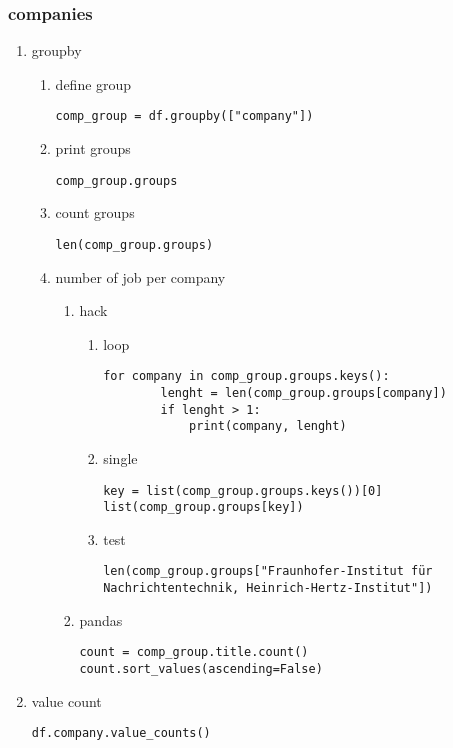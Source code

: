 \documentclass[11pt]{article}
\begin{document}
\subsubsection{companies}
\label{sec:orgbe85ddd}
\begin{enumerate}
\item groupby
\label{sec:org1908700}
\begin{enumerate}
\item define group
\label{sec:org2ef7af7}
\begin{verbatim}
comp_group = df.groupby(["company"])
\end{verbatim}

\item print groups
\label{sec:org9c28d8b}
\begin{verbatim}
comp_group.groups
\end{verbatim}
\item count groups
\label{sec:org6930f1d}
\begin{verbatim}
len(comp_group.groups)
\end{verbatim}
\item number of job per company
\label{sec:org691ee97}
\begin{enumerate}
\item hack
\label{sec:org04f9b52}
\begin{enumerate}
\item loop
\label{sec:org7eaaf0a}
\begin{verbatim}
for company in comp_group.groups.keys():
	    lenght = len(comp_group.groups[company])
	    if lenght > 1:
			print(company, lenght)
\end{verbatim}

\item single
\label{sec:orgf061eda}
\begin{verbatim}
key = list(comp_group.groups.keys())[0]
list(comp_group.groups[key])
\end{verbatim}

\item test
\label{sec:orgc584759}
\begin{verbatim}
len(comp_group.groups["Fraunhofer-Institut für Nachrichtentechnik, Heinrich-Hertz-Institut"])
\end{verbatim}
\end{enumerate}
\item pandas
\label{sec:orgcf29eac}
\begin{verbatim}
count = comp_group.title.count()
count.sort_values(ascending=False)
\end{verbatim}
\end{enumerate}
\end{enumerate}

\item value count
\label{sec:org0287973}
\begin{verbatim}
df.company.value_counts()
\end{verbatim}
\end{enumerate}
\end{document}
